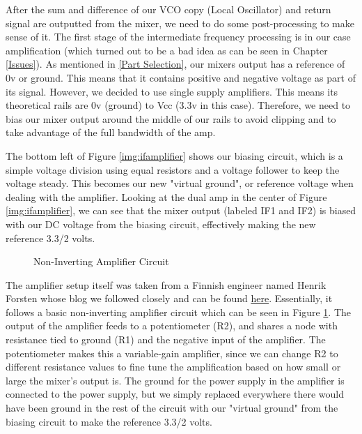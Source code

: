 After the sum and difference of our VCO copy (Local Oscillator) and return signal
are outputted from the mixer, we need to do some post-processing to make sense of it.
The first stage of the intermediate frequency processing is in our case
amplification (which turned out to be a bad idea as can be seen in Chapter \ref{Issues}).
As mentioned in \ref{Part Selection}, our mixers output has a reference of 0v or ground.
This means that it contains positive and negative voltage as part of its signal. However,
we decided to use single supply amplifiers. This means its theoretical rails are 0v (ground)
to Vcc (3.3v in this case). Therefore, we need to bias our mixer output around the middle of our rails
to avoid clipping and to take advantage of the full bandwidth of the amp.

The bottom left of Figure \ref{img:ifamplifier} shows our biasing circuit,
which is a simple voltage division using equal resistors and a voltage follower
to keep the voltage steady. This becomes our new "virtual ground", or reference voltage
when dealing with the amplifier. Looking at the dual amp in the center of Figure \ref{img:ifamplifier}, we can see that the mixer output (labeled IF1 and IF2) is
biased with our DC voltage from the biasing circuit, effectively making the new reference 3.3/2 volts. 

\begin{figure}[H]
  \centering
\caption{Non-Inverting Amplifier Circuit}
\label{img:noninverting}
\end{figure}

The amplifier setup itself was taken from a Finnish engineer named Henrik Forsten whose blog we followed closely and can be found
\href{https://hforsten.com/6-ghz-frequency-modulated-radar.html}{here}. Essentially, it follows a basic non-inverting amplifier
circuit which can be seen in Figure \ref{img:noninverting}. The output of the amplifier feeds to a potentiometer (R2), 
and shares a node with resistance tied to ground (R1) and the negative input of the amplifier. The potentiometer makes this
a variable-gain amplifier, since we can change R2 to different resistance values to fine tune the amplification based on how
small or large the mixer's output is. The ground for the power supply in the amplifier is connected to the power supply, but 
we simply replaced everywhere there would have been ground in the rest of the circuit with our "virtual ground" from the biasing circuit
to make the reference 3.3/2 volts.

